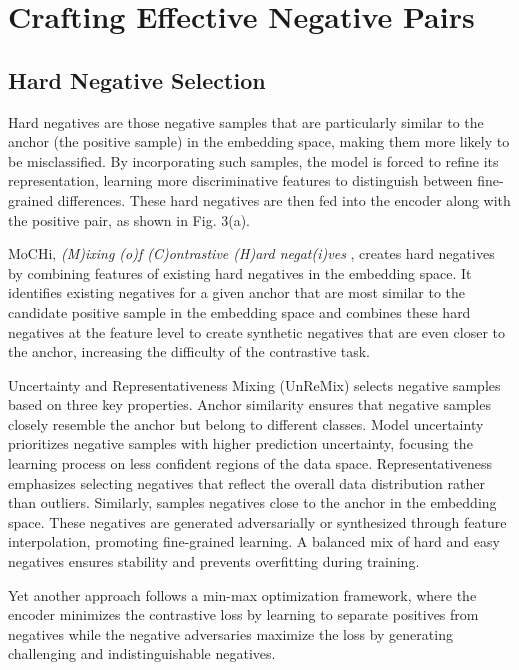 
\section{Crafting Effective Negative Pairs}
\label{sec: Negative_Pair}

\subsection{Hard Negative Selection}

Hard negatives are those negative samples that are particularly similar to the anchor (the positive sample) in the embedding space, making them more likely to be misclassified. By incorporating such samples, the model is forced to refine its representation, learning more discriminative features to distinguish between fine-grained differences. These hard negatives are then fed into the encoder along with the positive pair, as shown in Fig. 3(a).

MoCHi, \textit{(M)ixing (o)f (C)ontrastive (H)ard negat(i)ves} \cite{Hardnegativemixing}, creates hard negatives by combining features of existing hard negatives in the embedding space. It identifies existing negatives for a given anchor that are most similar to the candidate positive sample in the embedding space and combines these hard negatives at the feature level to create synthetic negatives that are even closer to the anchor, increasing the difficulty of the contrastive task.

Uncertainty and Representativeness Mixing (UnReMix) \cite{unremix} selects negative samples based on three key properties. Anchor similarity ensures that negative samples closely resemble the anchor but belong to different classes. Model uncertainty prioritizes negative samples with higher prediction uncertainty, focusing the learning process on less confident regions of the data space. Representativeness emphasizes selecting negatives that reflect the overall data distribution rather than outliers. Similarly, \cite{robinson2020contrastive} samples negatives close to the anchor in the embedding space.  These negatives are generated adversarially or synthesized through feature interpolation, promoting fine-grained learning. A balanced mix of hard and easy negatives ensures stability and prevents overfitting during training.

Yet another approach \cite{hu2021adco} follows a min-max optimization framework, where the encoder minimizes the contrastive loss by learning to separate positives from negatives while the negative adversaries maximize the loss by generating challenging and indistinguishable negatives.





